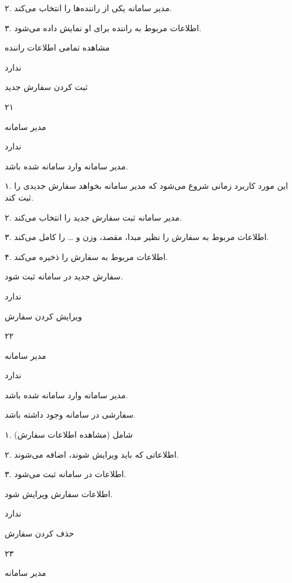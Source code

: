 ۲. مدیر سامانه یکی از راننده‌ها را انتخاب می‌کند.

۳. اطلاعات مربوط به راننده برای او نمایش داده می‌شود.

مشاهده تمامی اطلاعات راننده

ندارد

\newpage

ثبت کردن سفارش جدید

۲۱

مدیر سامانه

ندارد

مدیر سامانه وارد سامانه شده باشد.


۱. این مورد کاربرد زمانی شروع می‌شود که مدیر سامانه بخواهد سفارش جدیدی را ثبت کند.

۲. مدیر سامانه ثبت سفارش جدید را انتخاب می‌کند.

۳. اطلاعات مربوط به سفارش را نظیر مبدا، مقصد، وزن و … را کامل می‌کند.

۴. اطلاعات مربوط به سفارش را ذخیره می‌کند.

سفارش جدید در سامانه ثبت شود.

ندارد 


\newpage

ویرایش کردن سفارش

۲۲

مدیر سامانه

ندارد


مدیر سامانه وارد سامانه شده باشد.

سفارشی در سامانه وجود داشته باشد.


۱. شامل (مشاهده اطلاعات سفارش)

۲. اطلاعاتی که باید ویرایش شوند، اضافه می‌شوند.

۳. اطلاعات در سامانه ثبت می‌شود.

اطلاعات سفارش ویرایش شود.

ندارد

\newpage

حذف کردن سفارش

۲۳

مدیر سامانه

